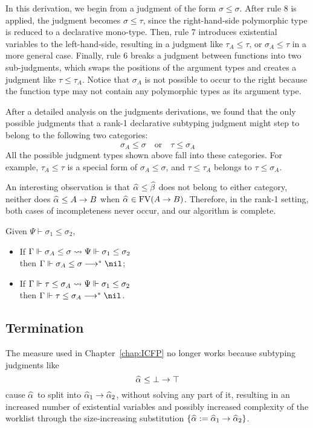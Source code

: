 In this derivation, we begin from a judgment of the form $\sigma \le \sigma$.
After rule 8 is applied, the judgment becomes $\sigma \le \tau$,
since the right-hand-side polymorphic type is reduced to a declarative mono-type.
Then, rule 7 introduces existential variables to the left-hand-side,
resulting in a judgment like $\tau_A \le \tau$,
or $\sigma_A \le \tau$ in a more general case.
Finally, rule 6 breaks a judgment between functions into two sub-judgments,
which swaps the positions of the argument types
and creates a judgment like $\tau \le \tau_A$.
Notice that $\sigma_A$ is not possible to occur to the right
because the function type may not contain any polymorphic types as its argument type.

After a detailed analysis on the judgments derivations,
we found that the only possible judgments that a rank-1 declarative subtyping judgment
might step to belong to the following two categories:
$$\sigma_A \le \sigma \quad\text{or}\quad \tau \le \sigma_A$$
All the possible judgment types shown above fall into these categories.
For example, $\tau_A \le \tau$ is a special form of $\sigma_A \le \sigma$,
and $\tau \le \tau_A$ belongs to $\tau \le \sigma_A$.

An interesting observation is that $\al \le \bt$ does not belong to either category,
neither does $\al \le A \to B$ when $\al \in \text{FV}(A \to B)$.
Therefore, in the rank-1 setting, both cases of incompleteness never occur,
and our algorithm is complete.

\begin{theorem}
    Given $\Psi \vdash \sigma_1 \le \sigma_2$,
    \begin{itemize}
        \item If $\Gamma \Vdash \sigma_A \le \sigma \rightsquigarrow \Psi \Vdash \sigma_1 \le \sigma_2$
            \\then $\Gm \Vdash \sigma_A \le \sigma \redto \nil$;
        \item If $\Gamma \Vdash \tau \le \sigma_A \rightsquigarrow \Psi \Vdash \sigma_1 \le \sigma_2$
            \\then $\Gm \Vdash \tau \le \sigma_A \redto \nil$.
    \end{itemize}
\end{theorem}

\subsection{Termination}

The measure used in Chapter~\ref{chap:ICFP} no longer works because subtyping judgments like
$$\al \le \bot \to \top$$
cause $\al$ to split into $\al[1] \to \al[2]$, without solving any part of it,
resulting in an increased number of existential variables
and possibly increased complexity of the worklist through the size-increasing substitution
$\{\al := \al[1] \to \al[2]\}$.

